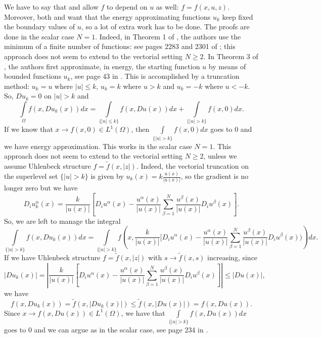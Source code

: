 \documentclass[a4paper,10pt]{article}
\theoremstyle{plain}
\theoremstyle{definition}
\numberwithin{equation}{section} \makeatletter
\begin{document}
\noindent
We have to say that \cite{BMT2024} and \cite{BBCLM}  allow $f$ to depend on $u$ as well: $f=f(x,u,z)$. 
Moreover, both \cite{BMT2024} and \cite{BBCLM} want that the energy approximating functions $u_k$ keep fixed the boundary values of $u$, so a lot of extra work has to be done. The proofs are done in the scalar case $N=1$. Indeed, in Theorem 1 of \cite{BMT2024}, the authors use the minimum of a finite number of functions: see pages 2283 and 2301 of \cite{BMT2024};  this approach
 does not seem to extend to the vectorial setting $N \geq 2$. In Theorem 3 of \cite{BBCLM}, the authors first approximate, in energy, the starting function $u$ by means of bounded functions $u_k$, see page 43 in \cite{BBCLM}. This is accomplished by a truncation method: $u_k = u$ where $|u| \leq k$, $u_k = k$ where $u>k$ and $u_k = -k$ where $u<-k$. So, $Du_k = 0$ on $|u|>k$ and 
 $$
 \int\limits_{ \Omega} f(x, Du_k(x)) dx
 =
\int\limits_{\{ |u| \leq k\} }
f(x, Du(x)) dx
+
\int\limits_{\{ |u| > k\}}
f(x, 0) dx.
$$
If we know that $x \to f(x,0) \in L^1(\Omega)$, then $\int\limits_{\{ |u| > k\}}
f(x, 0) dx$ goes to $0$ and we have energy approximation.
This works in the scalar case $N=1$. This approach does not seem to extend to the vectorial setting $N \geq 2$, unless we assume Uhlenbeck structure $f=\tilde{f}(x,|z|)$. Indeed, the vectorial truncation on the superlevel set $\{|u|>k\}$ is given by $u_k(x) = k \frac{u(x)}{|u(x)|}$, so the gradient is no longer zero but we have 
$$
D_i u_k^\alpha(x) = \frac{k}{|u(x)|} 
\left[
D_i u^\alpha(x) -  
\frac{u^\alpha(x)}{|u(x)|} 
\sum\limits_{\beta=1}^{N}
\frac{u^\beta(x)}{|u(x)|}
D_i u^\beta(x)
\right].
$$
So, we are left to manage the integral
$$
\int\limits_{\{ |u| > k\}}
f(x, Du_k(x)) dx
=
\int\limits_{\{ |u| > k\}}
f
\left(
x,\frac{k}{|u(x)|} 
[ 
D_i u^\alpha(x) -  
\frac{u^\alpha(x)}{|u(x)|} 
\sum\limits_{\beta=1}^{N}
\frac{u^\beta(x)}{|u(x)|}
D_i u^\beta(x)
)
\right) dx. 
$$
If we have Uhlenbeck structure $f=\tilde{f}(x,|z|)$ with $s \to \tilde{f}(x,s)$ increasing, since
$$
\left|
Du_k(x)  
\right|
=
\left|
\frac{k}{|u(x)|} 
\left[
D_i u^\alpha(x) -  
\frac{u^\alpha(x)}{|u(x)|} 
\sum\limits_{\beta=1}^{N}
\frac{u^\beta(x)}{|u(x)|}
D_i u^\beta(x)
\right]
\right|
\leq
\left|
D u(x)  
\right|,
$$
we have
$$
f(x,Du_k(x))=\tilde{f}(x,|Du_k(x)|) \leq \tilde{f}(x,|Du(x)|) = f(x,Du(x)).
$$
Since $x \to f(x,Du(x)) \in L^1(\Omega)$, we have that
$\int\limits_{\{ |u| > k \} } f(x,Du(x)) dx$ goes to $0$ and we can argue as in the scalar case, see page 234 in \cite{BuGwSk}.
\end{document}
